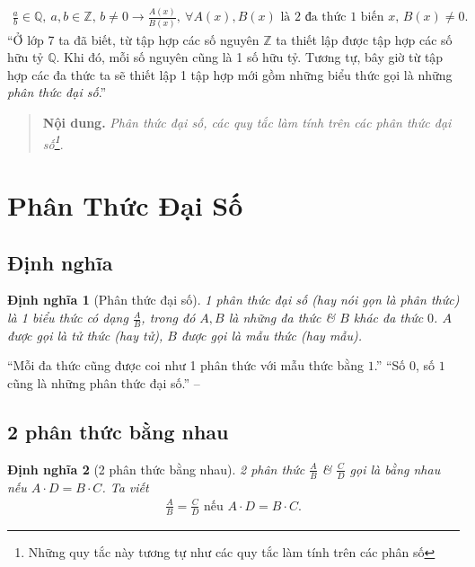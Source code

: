 \documentclass[oneside]{book}
\numberwithin{equation}{section}
\newtheorem{dinhnghia}{Định nghĩa}[section]
\begin{document}
\begin{align*}
	\frac{a}{b}\in\mathbb{Q},\ a,b\in\mathbb{Z},\,b\ne 0\longrightarrow\frac{A(x)}{B(x)},\ \forall A(x),B(x)\mbox{ là 2 đa thức 1 biến } x,\,B(x)\ne 0.
\end{align*}
``Ở lớp 7 ta đã biết, từ tập hợp các số nguyên $\mathbb{Z}$ ta thiết lập được tập hợp các số hữu tỷ $\mathbb{Q}$. Khi đó, mỗi số nguyên cũng là 1 số hữu tỷ. Tương tự, bây giờ từ tập hợp các đa thức ta sẽ thiết lập 1 tập hợp mới gồm những biểu thức gọi là những \textit{phân  thức đại số}.''

\begin{quotation}
	\textbf{Nội dung.} \textit{Phân thức đại số, các quy tắc làm tính trên các phân thức đại số\footnote{Những quy tắc này tương tự như các quy tắc làm tính trên các phân số}}.
\end{quotation}

\section{Phân Thức Đại Số}

\subsection{Định nghĩa}

\begin{dinhnghia}[Phân thức đại số]
	\emph{1 phân thức đại số} (hay nói gọn là \emph{phân thức}) là 1 biểu thức có dạng $\frac{A}{B}$, trong đó $A,B$ là những đa thức \& $B$ khác đa thức $0$. $A$ được gọi là \emph{tử thức} (hay \emph{tử}), $B$ được gọi là \emph{mẫu thức} (hay \emph{mẫu}).
\end{dinhnghia}
``Mỗi đa thức cũng được coi như 1 phân thức với mẫu thức bằng $1$.'' ``Số $0$, số $1$ cũng là những phân thức đại số.'' -- \cite[p. 35]{SGK_Toan_8_tap_1}

\subsection{2 phân thức bằng nhau}

\begin{dinhnghia}[2 phân thức bằng nhau]
	2 phân thức $\frac{A}{B}$ \& $\frac{C}{D}$ gọi là \emph{bằng nhau} nếu $A\cdot D = B\cdot C$. Ta viết
	\begin{align*}
		\frac{A}{B} = \frac{C}{D}\mbox{ nếu } A\cdot D = B\cdot C.
	\end{align*}
\end{dinhnghia}
\end{document}
